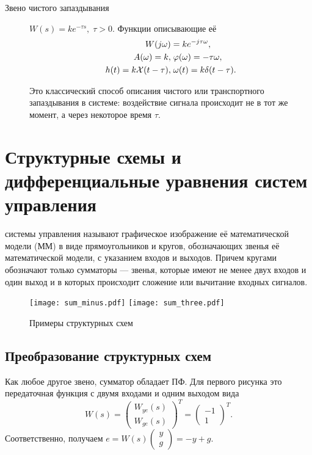 \documentclass[../../TAU.tex]{subfiles}
\begin{document}
\begin{description}
    \item[Звено чистого запаздывания]
        $W(s) = ke^{-\tau s},\; \tau > 0$. Функции описывающие её
        $$
            \begin{aligned}
                W(j\omega) &= ke^{-j\tau\omega},\\
                A(\omega) = k,&\; \varphi(\omega) = -\tau\omega,\\
                h(t) = k\mathcal{X}(t-\tau),&\; \omega(t) = k\delta(t-\tau).
            \end{aligned}
        $$

        Это классический способ описания чистого или транспортного запаздывания в системе: воздействие сигнала происходит не в тот же момент, а через некоторое время $\tau$.
\end{description}

\section{Структурные схемы и дифференциальные уравнения систем управления}

     системы управления называют графическое изображение её математической модели (ММ) в виде прямоугольников и кругов, обозначающих звенья её математической модели, с указанием входов и выходов. Причем кругами обозначают только сумматоры --- звенья, которые имеют не менее двух входов и один выход и в которых происходит сложение или вычитание входных сигналов.

    \begin{figure}[h]
        \centering
        \texttt{[image: sum\_minus.pdf]}
        \texttt{[image: sum\_three.pdf]}
        \caption{Примеры структурных схем}
        \centering
    \end{figure}

\subsection{Преобразование структурных схем}

    Как любое другое звено, сумматор обладает ПФ. Для первого рисунка это передаточная функция с двумя входами и одним выходом вида
    $$
        W(s) =
        \begin{pmatrix}
            W_{ye}(s)\\
            W_{ge}(s)
        \end{pmatrix}^T =
        \begin{pmatrix}
            -1\\
            1
        \end{pmatrix}^T.
    $$
    Соответственно, получаем 
    $e = W(s)\begin{pmatrix}y\\g\end{pmatrix} = -y+g$.
\end{document}
